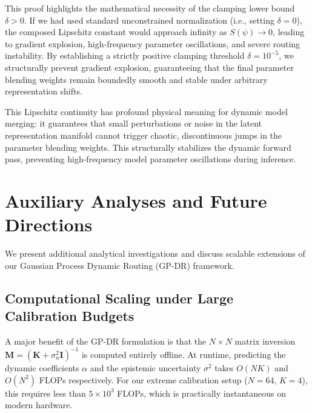 \documentclass{article}
\theoremstyle{plain}
\theoremstyle{definition}
\theoremstyle{remark}
\begin{document}
This proof highlights the mathematical necessity of the clamping lower bound $\delta > 0$. If we had used standard unconstrained normalization (i.e., setting $\delta = 0$), the composed Lipschitz constant would approach infinity as $S(\psi) \to 0$, leading to gradient explosion, high-frequency parameter oscillations, and severe routing instability. By establishing a strictly positive clamping threshold $\delta = 10^{-5}$, we structurally prevent gradient explosion, guaranteeing that the final parameter blending weights remain boundedly smooth and stable under arbitrary representation shifts.

This Lipschitz continuity has profound physical meaning for dynamic model merging: it guarantees that small perturbations or noise in the latent representation manifold cannot trigger chaotic, discontinuous jumps in the parameter blending weights. This structurally stabilizes the dynamic forward pass, preventing high-frequency model parameter oscillations during inference.

\section{Auxiliary Analyses and Future Directions}
\label{app:auxiliary}

We present additional analytical investigations and discuss scalable extensions of our Gaussian Process Dynamic Routing (GP-DR) framework.

\subsection{Computational Scaling under Large Calibration Budgets}
A major benefit of the GP-DR formulation is that the $N \times N$ matrix inversion $\mathbf{M} = (\mathbf{K} + \sigma_n^2 \mathbf{I})^{-1}$ is computed entirely offline. At runtime, predicting the dynamic coefficients $\alpha$ and the epistemic uncertainty $\sigma^2$ takes $O(NK)$ and $O(N^2)$ FLOPs respectively. For our extreme calibration setup ($N=64$, $K=4$), this requires less than $5 \times 10^3$ FLOPs, which is practically instantaneous on modern hardware.
\end{document}
